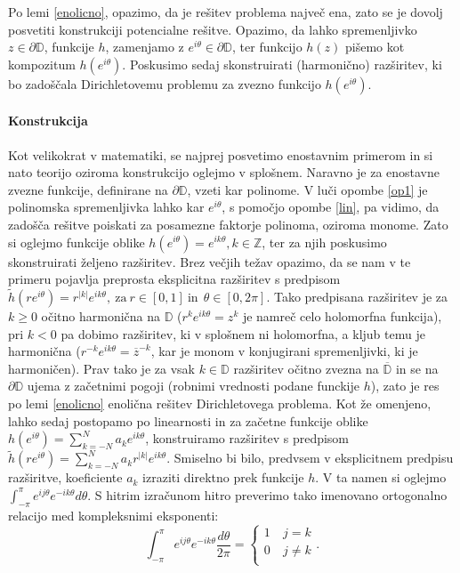 \documentclass[mat1]{fmfdelo}
\begin{document}
    \begin{opomba}
        \label{op1}
        Po lemi \ref{enolicno}, opazimo, da je rešitev problema največ ena, zato se je dovolj posvetiti konstrukciji potencialne rešitve. 
        Opazimo, da lahko spremenljivko $z \in \partial \mathbb{D}$, funkcije $h$, zamenjamo z $e^{i \theta} \in \partial \mathbb{D}$, ter funkcijo $h(z)$ pišemo kot kompozitum $h(e^{i \theta})$.
        Poskusimo sedaj skonstruirati (harmonično) razširitev, ki bo zadoščala Dirichletovemu problemu za zvezno funkcijo $h(e^{i \theta})$.
    \end{opomba}

    \paragraph[short]{\textbf{Konstrukcija}}
    Kot velikokrat v matematiki, se najprej posvetimo enostavnim primerom in si nato teorijo oziroma konstrukcijo oglejmo v splošnem. 
    Naravno je za enostavne zvezne funkcije, definirane na $\partial \mathbb{D}$, vzeti kar polinome. V luči opombe \ref{op1} je polinomska spremenljivka lahko kar $e^{i\theta}$, s pomočjo opombe \ref{lin}, pa vidimo, da zadošča rešitve poiskati za posamezne faktorje polinoma, oziroma monome. 
    Zato si oglejmo funkcije oblike $h(e^{i \theta}) = e^{i k \theta}, k \in \mathbb{Z}$, ter za njih poskusimo skonstruirati željeno razširitev. 
    Brez večjih težav opazimo, da se nam v te primeru pojavlja preprosta eksplicitna razširitev s predpisom $\widetilde{h}(r e^{i \theta}) = r^{|k|}e^{i k \theta},~\text{za}~r\in [0, 1]~\text{in}~~\theta \in [0, 2\pi]$. 
    Tako predpisana razširitev je za $k \geq 0$ očitno harmonična na $\mathbb{D}$ ($r^k e^{ik\theta} = z^k$ je namreč celo holomorfna funkcija), pri $k < 0$ pa dobimo razširitev, ki v splošnem ni holomorfna, a kljub temu je harmonična ($r^{-k} e^{ik\theta} = \overline{z}^{-k}$, kar je monom v konjugirani spremenljivki, ki je harmoničen).
    Prav tako je za vsak $k \in \mathbb{D}$ razširitev očitno zvezna na $\overline{\mathbb{D}}$ in se na $\partial \mathbb{D}$ ujema z začetnimi pogoji (robnimi vrednosti podane funckije $h$), zato je res po lemi \ref{enolicno} enolična rešitev Dirichletovega problema. 
    Kot že omenjeno, lahko sedaj postopamo po linearnosti in za začetne funkcije oblike $h(e^{i\theta}) = \sum_{k = -N}^{N}{a_k e^{ik\theta}}$, konstruiramo razširitev s predpisom
    $\widetilde{h}(r e^{i \theta}) = \sum_{k = -N}^{N}{a_k r^{|k|}e^{ik\theta}}$. Smiselno bi bilo, predvsem v eksplicitnem predpisu razširitve, koeficiente $a_k$ izraziti direktno prek funkcije $h$. 
    V ta namen si oglejmo $\int_{-\pi}^{\pi}{e^{ij\theta} e^{-ik\theta}d\theta}$. S hitrim izračunom hitro preverimo tako imenovano ortogonalno relacijo med kompleksnimi eksponenti:
        $$
        \int_{-\pi}^{\pi}{e^{ij\theta} e^{-ik\theta}\frac{d\theta}{2\pi}} = 
        \begin{cases}
            1~&j=k\\
            0~&j \neq k\\
        \end{cases}
        .$$
\end{document}

